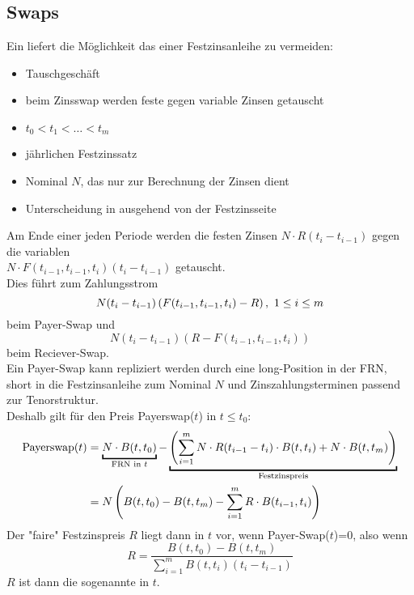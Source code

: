 \subsection{Swaps}
\label{sub:swaps}
Ein  liefert die Möglichkeit das  einer Festzinsanleihe zu vermeiden:\\
\begin{itemize}
	\item Tauschgeschäft
	\item beim Zinsswap werden feste gegen variable Zinsen getauscht
	\item {} $t_0<t_1<\dots<t_m$
	\item jährlichen Festzinssatz
	\item Nominal $N$, das nur zur Berechnung der Zinsen dient
	\item Unterscheidung in   ausgehend von der Festzinsseite
\end{itemize}
Am Ende einer jeden Periode werden die festen Zinsen $N\cdot R(t_i-t_{i-1})$ gegen die variablen\\ $N\cdot F(t_{i-1},t_{i-1},t_i)(t_i-t_{i-1})$ getauscht.\\
Dies führt zum Zahlungsstrom
\[N(t_i-t_{i-1})\left( F(t_{i-1},t_{i-1},t_i)-R\right),~1\le i\le m \]
beim Payer-Swap und
\[N(t_i-t_{i-1})(R-F(t_{i-1},t_{i-1},t_i)) \]
beim Reciever-Swap.\\
Ein Payer-Swap kann repliziert werden durch eine long-Position in der FRN, short in die Festzinsanleihe zum Nominal $N$ und Zinszahlungsterminen passend zur Tenorstruktur.\\
Deshalb gilt für den Preis Payerswap($t$) in $t\le t_0$:\\
\begin{equation*}
\begin{aligned}
	\text{Payerswap}(t) &= \underbracket{N\cdot B(t,t_0)}_{\text{FRN in }t}-\underbracket{\enbrace{\sum_{i=1}^{m}N\cdot R(t_{i-1}-t_i) \cdot B(t,t_i)+N\cdot B(t,t_m)}}_{\text{Festzinspreis}}\\
	&=N\enbrace{B(t,t_0)-B(t,t_m)-\sum_{i=1}^{m}R\cdot B(t_{i-1},t_i)}
\end{aligned}
\end{equation*}
Der "faire" Festzinspreis $R$ liegt dann in $t$ vor, wenn Payer-Swap($t$)=0, also wenn
\[R= \frac{B(t,t_0)-B(t,t_m)}{\sum_{i=1}^{m}B(t,t_i)(t_i-t_{i-1})} \]
$R$ ist dann die sogenannte  in $t$.

